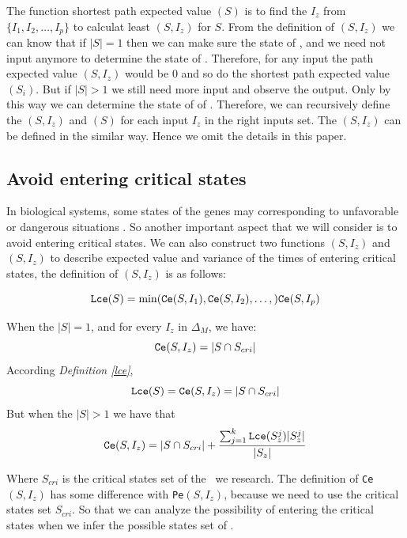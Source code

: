 The function shortest path  expected value \Spe$(S)$ is to find the $I_z$ from $\{I_1,I_2,\ldots, I_p\}$ to calculat least \Pe$(S, I_z)$ for $S$. From the definition of \Pe$(S, I_z)$ we can know that if $|S|=1$ then we can make sure the state of \BCNs, and we need not input anymore to determine the state of \BCNs. Therefore, for any input the path expected value \Pe$(S, I_z)$ would be $0$ and so do the shortest path  expected value \Spe$(S_i)$. But if $|S|>1$ we still need more input and observe the output. Only by this way we can determine the state of of \BCNs. Therefore,  we can recursively define the \Pe$(S, I_z)$ and \Spe$(S)$ for each input $I_z$ in the right inputs set.  The \Pv$(S, I_z)$ can be defined in the similar way. Hence we omit the details in this paper. 

\subsection{Avoid entering critical states}
In biological systems, some states of the genes may corresponding to unfavorable or dangerous situations \cite{Li2014Controllability}. So another important aspect that we will consider is to avoid entering critical states. We can also construct two functions \Ce$(S, I_z)$ and \Cv$(S, I_z)$ to describe expected value and variance of the times of entering critical states, the definition of \Ce$(S, I_z)$ is as follows:\\
\begin{definition}[\Lce$(S)$] \label{lce}
\[{\tt Lce}(S)= \min({\tt Ce}(S, I_1),{\tt Ce}(S, I_2),\ldots,){\tt Ce}(S, I_p)\]
\end{definition}
\begin{definition}[\Ce$(S, I_z)$] 
When the $|S|=1$, and for every $I_z$ in $\Delta_M$, we have: \[{\tt Ce}(S, I_z)=|S \cap S_{cri} |\] 
According {\em Definition \ref{lce}}, %
\[{\tt Lce}(S)={\tt Ce}(S, I_z)=|S \cap S_{cri} |\] 
But when the $|S|>1$ 
we have that 
\[{\tt Ce}(S, I_z)=|S \cap S_{cri} | +\frac{\sum_{j=1}^k {\tt Lce}(S_z^j)|S_z^j|}{ |S_z|} \] 
\end{definition}

Where $S_{cri}$ is the critical states set of the \BCN\ we research. The definition of {\tt Ce}$(S, I_z)$ has some difference with {\tt Pe}$(S, I_z)$, because we need to use the critical states set $S_{cri}$. So that  we can analyze the possibility of entering the  critical states when we infer the possible states set of \BCNs.

